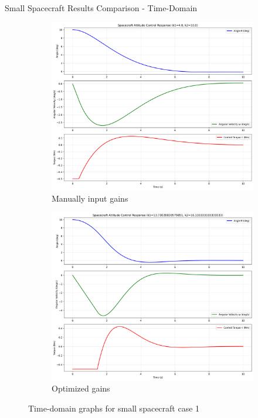 \documentclass{beamer}
\begin{document}
\begin{frame}{Small Spacecraft Results Comparison - Time-Domain}
    \begin{figure}[H]
    \label{Fig. 1}
    \centering
    \begin{subfigure}[b]{0.48\columnwidth}
        \label{Fig. 1.A}
        \centering
        \includegraphics[width=\linewidth]{base_time_domain(4).pdf}
        \caption{Manually input gains}
        \label{fig:subfig1}
    \end{subfigure}
    \hfill
    \begin{subfigure}[b]{0.48\columnwidth}
        \label{Fig. 1.B}
        \centering
        \includegraphics[width=\linewidth]{best_time_domain(4).pdf}
        \caption{Optimized gains}
        \label{fig:subfig2}
    \end{subfigure}
    \caption{Time-domain graphs for small spacecraft case 1}
    \label{fig:combined}
\end{figure}
\end{frame}
\end{document}
